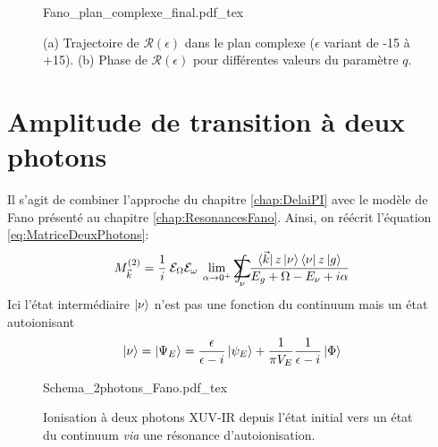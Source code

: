 \begin{figure}
\centering
\def\svgwidth{\textwidth}
{Fano_plan_complexe_final.pdf_tex}
\caption{(a) Trajectoire de $\mathcal{R}(\epsilon)$ dans le plan complexe ($\epsilon$ variant de -15 à +15). (b) Phase de $\mathcal{R}(\epsilon)$ pour différentes valeurs du paramètre $q$.}
\label{fig:FanoPlanComplexeFinal}
\end{figure}

\section{Amplitude de transition à deux photons}
Il s'agit de combiner l'approche du chapitre \ref{chap:DelaiPI} avec le modèle de Fano présenté au chapitre \ref{chap:ResonancesFano}. Ainsi, on réécrit l'équation \ref{eq:MatriceDeuxPhotons}:
\begin{equation}
M_{\vec{k}}^{(2)} = \frac{1}{i} \: \mathcal{E}_\Omega \mathcal{E}_\omega \: \lim \limits_{\alpha \rightarrow 0^+} \sum_{\nu} \! \! \! \! \! \! \! \! \! \int \frac{\bra{\vec{k}} z\ket{\nu} \bra{\nu} z \ket{g}} {E_g + \Omega - E_{\nu} + i \alpha}
\end{equation}
Ici l'état intermédiaire $\ket{\nu}$ n'est pas une fonction du continuum mais un état autoionisant
\begin{equation}
\ket{\nu} = \ket{\Psi_E} = \frac{\epsilon}{\epsilon - i} \ket{\psi_E} + \frac{1}{\pi V_E} \frac{1}{\epsilon - i} \ket{\Phi}
\end{equation}

\begin{figure}
\centering
\def\svgwidth{0.5\textwidth}
{Schema_2photons_Fano.pdf_tex}
\caption{Ionisation à deux photons XUV-IR depuis l'état initial vers un état du continuum \textit{via} une résonance d'autoionisation.}
\end{figure}

